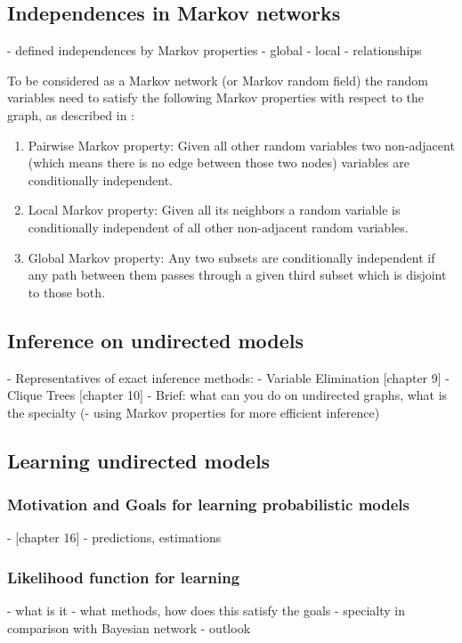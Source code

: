 \subsection{Independences in Markov networks} \label{sec:indep}

- defined independences by Markov properties
- global
- local
- relationships

To be considered as a Markov network (or Markov random field) the random variables need to satisfy the following Markov properties with respect to the graph, as described in \cite{markov1957theory}:

\begin{enumerate}
\item Pairwise Markov property: Given all other random variables two non-adjacent (which means there is no edge between those two nodes) variables are conditionally independent.
\item Local Markov property: Given all its neighbors a random variable is conditionally independent of all other non-adjacent random variables.
\item Global Markov property: Any two subsets are conditionally independent if any path between them passes through a given third subset which is disjoint to those both.  
\end{enumerate}


\subsection{Inference on undirected models} \label{sec:infer}

- Representatives of exact inference methods:
  - Variable Elimination [chapter 9]
  - Clique Trees [chapter 10]
- Brief: what can you do on undirected graphs, what is the specialty
(- using Markov properties for more efficient inference)

\subsection{Learning undirected models}

\subsubsection{Motivation and Goals for learning probabilistic models}
- [chapter 16]
- predictions, estimations

\subsubsection{Likelihood function for learning}

- what is it
- what methods, how does this satisfy the goals
- specialty in comparison with Bayesian network
- outlook